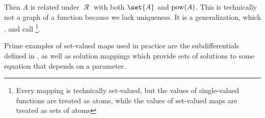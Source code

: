 \begin{remark}
  Then \( A \) is related under \( \mscrR \) with both \( \set{ A } \) and \( \operatorname{pow}(A) \). This is technically not a graph of a function because we lack uniqueness. It is a generalization, which ,  and  call \footnote{Every mapping is technically set-valued, but the values of single-valued functions are treated as atoms, while the values of set-valued maps are treated as sets of atoms}.

  Prime examples of set-valued maps used in practice are the subdifferentials defined in , as well as solution mappings which provide sets of solutions to some equation that depends on a parameter.
\end{remark}

